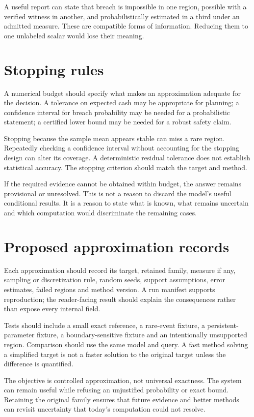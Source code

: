 A useful report can state that breach is impossible in one region, possible with a verified witness in another, and probabilistically estimated in a third under an admitted measure. These are compatible forms of information. Reducing them to one unlabeled scalar would lose their meaning.

\section{Stopping rules}
A numerical budget should specify what makes an approximation adequate for the decision. A tolerance on expected cash may be appropriate for planning; a confidence interval for breach probability may be needed for a probabilistic statement; a certified lower bound may be needed for a robust safety claim.

Stopping because the sample mean appears stable can miss a rare region. Repeatedly checking a confidence interval without accounting for the stopping design can alter its coverage. A deterministic residual tolerance does not establish statistical accuracy. The stopping criterion should match the target and method.

If the required evidence cannot be obtained within budget, the answer remains provisional or unresolved. This is not a reason to discard the model's useful conditional results. It is a reason to state what is known, what remains uncertain and which computation would discriminate the remaining cases.

\section{Proposed approximation records}
Each approximation should record its target, retained family, measure if any, sampling or discretization rule, random seeds, support assumptions, error estimates, failed regions and method version. A run manifest supports reproduction; the reader-facing result should explain the consequences rather than expose every internal field.

Tests should include a small exact reference, a rare-event fixture, a persistent-parameter fixture, a boundary-sensitive fixture and an intentionally unsupported region. Comparison should use the same model and query. A fast method solving a simplified target is not a faster solution to the original target unless the difference is quantified.

The objective is controlled approximation, not universal exactness. The system can remain useful while refusing an unjustified probability or exact bound. Retaining the original family ensures that future evidence and better methods can revisit uncertainty that today's computation could not resolve.
